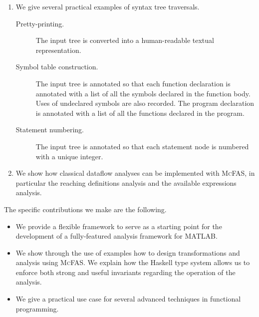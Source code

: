 \documentclass[letterpaper,11pt]{article}
\newcommand{\mcfas}{\textsc{McFAS}}
\newcommand{\matlab}{MATLAB}
\begin{document}
\begin{enumerate}
  \item
    We give several practical examples of syntax tree traversals.

    \begin{description}
      \item[Pretty-printing.]
        The input tree is converted into a human-readable textual
        representation.

      \item[Symbol table construction.]
        The input tree is annotated so that each function declaration is
        annotated with a list of all the symbols declared in the function body.
        Uses of undeclared symbols are also recorded. The program declaration
        is annotated with a list of all the functions declared in the program.

      \item[Statement numbering.]
        The input tree is annotated so that each statement node is numbered
        with a unique integer.
    \end{description}

  \item
    We show how classical dataflow analyses can be implemented with \mcfas, in
    particular the reaching definitions analysis and the available expressions
    analysis.
\end{enumerate}

The specific contributions we make are the following.

\begin{itemize}
  \item
    We provide a flexible framework to serve as a starting point for the
    development of a fully-featured analysis framework for \matlab{}.

  \item
    We show through the use of examples how to design transformations and
    analysis using \mcfas{}. We explain how the Haskell type system allows us
    to enforce both strong and useful invariants regarding the operation of the
    analysis.

  \item
    We give a practical use case for several advanced techniques in functional
    programming.
\end{itemize}



\end{document}

